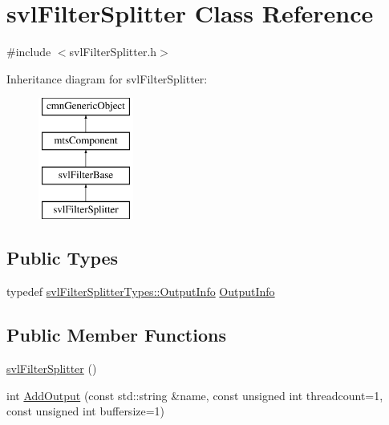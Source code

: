 \hypertarget{classsvl_filter_splitter}{}\section{svl\+Filter\+Splitter Class Reference}
\label{classsvl_filter_splitter}


{\ttfamily \#include $<$svl\+Filter\+Splitter.\+h$>$}

Inheritance diagram for svl\+Filter\+Splitter\+:\begin{figure}[H]
\begin{center}
\leavevmode
\includegraphics[height=4.000000cm]{db/d8e/classsvl_filter_splitter}
\end{center}
\end{figure}
\subsection*{Public Types}
\begin{DoxyCompactItemize}
\item 
typedef \hyperlink{classsvl_filter_splitter_types_1_1_output_info}{svl\+Filter\+Splitter\+Types\+::\+Output\+Info} \hyperlink{classsvl_filter_splitter_a21cb33e85d6f3ebafae8b753210a9ff9}{Output\+Info}
\end{DoxyCompactItemize}
\subsection*{Public Member Functions}
\begin{DoxyCompactItemize}
\item 
\hyperlink{classsvl_filter_splitter_a50e97bbd5a557965a57c9886db15e262}{svl\+Filter\+Splitter} ()
\item 
int \hyperlink{classsvl_filter_splitter_aed61ad571ff07d744e0252435620b10e}{Add\+Output} (const std\+::string \&name, const unsigned int threadcount=1, const unsigned int buffersize=1)
\end{DoxyCompactItemize}
